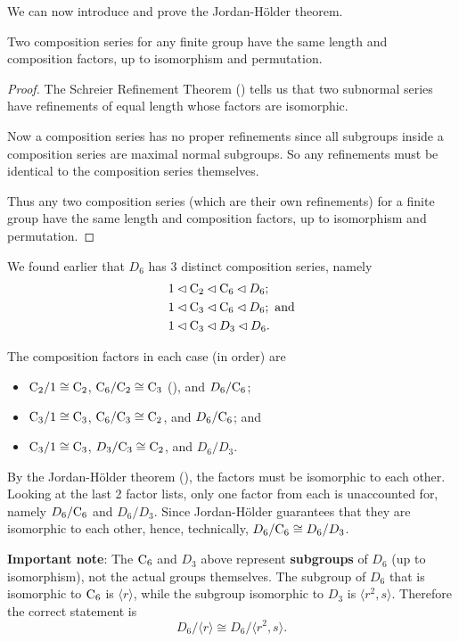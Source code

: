 We can now introduce and prove the Jordan-H\"older theorem.

\begin{theorem}\label{thrm-jordan-holder}
    Two composition series for any finite group have the same length and composition factors, up to isomorphism and permutation.
\end{theorem}
\begin{proof}
    The Schreier Refinement Theorem () tells us that two subnormal series have refinements of equal length whose factors are isomorphic.

    Now a composition series has no proper refinements since all subgroups inside a composition series are maximal normal subgroups. So any refinements must be identical to the composition series themselves.

    Thus any two composition series (which are their own refinements) for a finite group have the same length and composition factors, up to isomorphism and permutation.
\end{proof}

\begin{example}
    We found earlier that $D_6$ has 3 distinct composition series, namely
    \begin{align*}
        &1 \lhd \mathrm{C}_{2} \lhd \mathrm{C}_{6} \lhd D_6;\\
        &1 \lhd \mathrm{C}_{3} \lhd \mathrm{C}_{6} \lhd D_6; \text{ and}\\
        &1 \lhd \mathrm{C}_{3} \lhd D_3 \lhd D_6.
    \end{align*}

    \newpage
    
    The composition factors in each case (in order) are
    \begin{itemize}
        \item $\mathrm{C}_{2}/1 \cong \mathrm{C}_{2}$, $\mathrm{C}_{6}/\mathrm{C}_{2} \cong \mathrm{C}_{3}$ (), and $D_6 / \mathrm{C}_{6}$;
        \item $\mathrm{C}_{3}/1 \cong \mathrm{C}_{3}$, $\mathrm{C}_{6}/\mathrm{C}_{3} \cong \mathrm{C}_{2}$, and $D_6 / \mathrm{C}_{6}$; and
        \item $\mathrm{C}_{3}/1 \cong \mathrm{C}_{3}$, $D_3 / \mathrm{C}_{3} \cong \mathrm{C}_{2}$, and $D_6 / D_3$.
    \end{itemize}
    By the Jordan-H\"older theorem (), the factors must be isomorphic to each other. Looking at the last 2 factor lists, only one factor from each is unaccounted for, namely $D_6 / \mathrm{C}_{6}$ and $D_6 / D_3$. Since Jordan-H\"older guarantees that they are isomorphic to each other, hence, technically, $D_6 / \mathrm{C}_{6} \cong D_6 / D_3$.

    \textbf{Important note}: The $\mathrm{C}_{6}$ and $D_3$ above represent \textbf{subgroups} of $D_6$ (up to isomorphism), not the actual groups themselves. The subgroup of $D_6$ that is isomorphic to $\mathrm{C}_{6}$ is $\langle r \rangle$, while the subgroup isomorphic to $D_3$ is $\langle r^2, s\rangle$. Therefore the correct statement is
    \[
        D_6 / \langle r \rangle \cong D_6 / \langle r^2, s\rangle.
    \]
\end{example}

